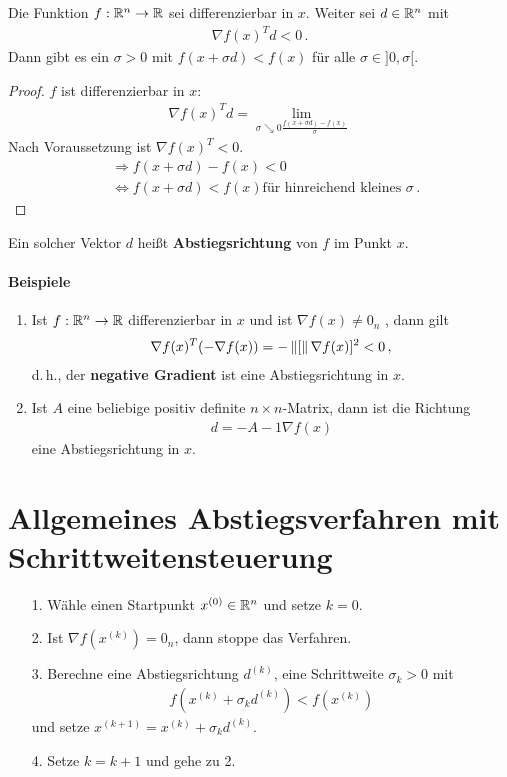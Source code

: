 \begin{Lemma}
Die Funktion $f : \mathbb R^n \rightarrow \mathbb R$ sei differenzierbar in $x$. Weiter sei $d \in \mathbb R^n$ mit
\begin{align*}
\nabla f(x)^Td < 0\,.
\end{align*}
Dann gibt es ein $\sigma > 0$ mit $f(x + \sigma d) < f (x)$ für alle $\sigma \in ]0, \sigma[$.
\end{Lemma}
\begin{proof}
$f$ ist differenzierbar in $x$:
\begin{align*}
\nabla f(x)^Td=\lim_{\sigma\searrow 0 \frac{f(x+\sigma d)-f(x)}{\sigma}}
\end{align*}
Nach Voraussetzung ist $\nabla f(x)^T<0$.
\begin{align*}
&\Rightarrow f(x+\sigma d)-f(x)< 0\\
&\Leftrightarrow f(x+\sigma d)<f(x) \text{für hinreichend kleines } \sigma \,.
\end{align*}
\end{proof}
Ein solcher Vektor $d$ heißt \textbf{Abstiegsrichtung} von $f$ im Punkt $x$.

\paragraph{Beispiele}
\begin{enumerate}[label=\emph{\alph*})]
\item Ist $f : \mathbb R^n \rightarrow \mathbb R$ differenzierbar in $x$ und ist $\nabla f(x) \neq 0_n$ , dann gilt
\begin{align*}
\nabla f(x)^T (-\nabla f(x)) = - \left\lVert[\right\rVert\nabla f(x)]^2< 0 \,,
\end{align*}
d.\,h., der \textbf{negative Gradient} ist eine Abstiegsrichtung in $x$.
\item Ist $A$ eine beliebige positiv definite $n \times n$-Matrix, dann ist die Richtung
\begin{align*}
d = -A-1 \nabla f(x)
\end{align*}
eine Abstiegsrichtung in $x$.
\end{enumerate}

\section{Allgemeines Abstiegsverfahren mit Schrittweitensteuerung}
\begin{itemize}
\item[1.] Wähle einen Startpunkt $x^{(0)} \in \mathbb R^n$ und setze $k = 0$.
\item[2.] Ist $\nabla f(x^{(k)}) = 0_n$, dann stoppe das Verfahren.
\item[3.] Berechne eine Abstiegsrichtung $d^{(k)}$, eine Schrittweite $\sigma_k > 0$ mit
\begin{align*}
f (x^{(k)} + \sigma_k d^{(k)}) < f (x^{(k)})
\end{align*}
und setze $x^{(k+1)} = x^{(k)} + \sigma_k d^{(k)}$.
\item[4.] Setze $k = k + 1$ und gehe zu 2.
\end{itemize}

